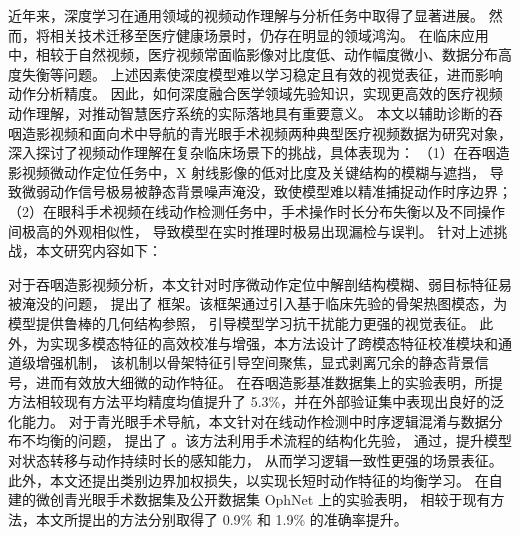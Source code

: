 \begin{abstractCN}
近年来，深度学习在通用领域的视频动作理解与分析任务中取得了显著进展。
然而，将相关技术迁移至医疗健康场景时，仍存在明显的领域鸿沟。
在临床应用中，相较于自然视频，医疗视频常面临影像对比度低、动作幅度微小、数据分布高度失衡等问题。
上述因素使深度模型难以学习稳定且有效的视觉表征，进而影响动作分析精度。
因此，如何深度融合医学领域先验知识，实现更高效的医疗视频动作理解，对推动智慧医疗系统的实际落地具有重要意义。
本文以辅助诊断的吞咽造影视频和面向术中导航的青光眼手术视频两种典型医疗视频数据为研究对象，
深入探讨了视频动作理解在复杂临床场景下的挑战，具体表现为：
（1）在吞咽造影视频微动作定位任务中，X 射线影像的低对比度及关键结构的模糊与遮挡，
导致微弱动作信号极易被静态背景噪声淹没，致使模型难以精准捕捉动作时序边界；
（2）在眼科手术视频在线动作检测任务中，手术操作时长分布失衡以及不同操作间极高的外观相似性，
导致模型在实时推理时极易出现漏检与误判。
针对上述挑战，本文研究内容如下：

对于吞咽造影视频分析，本文针对时序微动作定位中解剖结构模糊、弱目标特征易被淹没的问题，
提出了 \fullname 框架。该框架通过引入基于临床先验的骨架热图模态，为模型提供鲁棒的几何结构参照，
引导模型学习抗干扰能力更强的视觉表征。
此外，为实现多模态特征的高效校准与增强，本方法设计了跨模态特征校准模块和通道级增强机制，
该机制以骨架特征引导空间聚焦，显式剥离冗余的静态背景信号，进而有效放大细微的动作特征。
在吞咽造影基准数据集上的实验表明，所提方法相较现有方法平均精度均值提升了 5.3\%，并在外部验证集中表现出良好的泛化能力。
对于青光眼手术导航，本文针对在线动作检测中时序逻辑混淆与数据分布不均衡的问题，
提出了 \fulltwo。该方法利用手术流程的结构化先验，
通过\graphmodulefull，提升模型对状态转移与动作持续时长的感知能力，
从而学习逻辑一致性更强的场景表征。此外，本文还提出类别边界加权损失，以实现长短时动作特征的均衡学习。
在自建的微创青光眼手术数据集及公开数据集 OphNet 上的实验表明，
相较于现有方法，本文所提出的方法分别取得了 0.9\% 和 1.9\% 的准确率提升。
\end{abstractCN}
